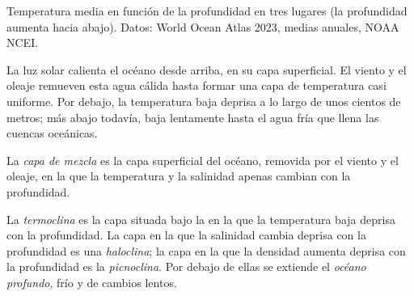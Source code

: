 \begin{omfigure}

{\small Temperatura media en función de la profundidad en tres lugares (la
profundidad aumenta hacia abajo). Datos: World Ocean Atlas 2023, medias
anuales, NOAA NCEI.}
\end{omfigure}

La luz solar calienta el océano desde arriba, en su capa superficial. El viento y el oleaje remueven esta agua cálida hasta formar una capa de
temperatura casi uniforme. Por debajo, la temperatura baja deprisa a lo largo
de unos cientos de metros; más abajo todavía, baja lentamente hasta el agua
fría que llena las cuencas oceánicas.

\begin{definition}\label{def:g10:layered-ocean:mixed-layer}
La \emph{capa de mezcla} es la capa superficial del
océano, removida por el viento y el oleaje, en la que la temperatura y la
salinidad apenas cambian con la profundidad.
\end{definition}

\begin{definition}\label{def:g10:layered-ocean:thermocline}
La \emph{termoclina} es la capa situada bajo la  en la que la temperatura baja deprisa con la profundidad. La capa en la
que la salinidad cambia deprisa con la profundidad es una
\emph{haloclina}; la capa en la que la densidad aumenta
deprisa con la profundidad es la \emph{picnoclina}. Por
debajo de ellas se extiende el \emph{océano
profundo}, frío y de cambios lentos.
\end{definition}

